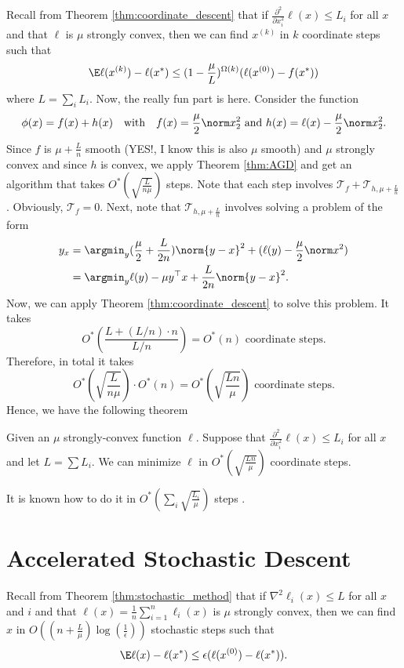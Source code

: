 Recall from Theorem \ref{thm:coordinate_descent} that if $\frac{\partial^{2}}{\partial x_{i}^{2}}\ell(x)\leq L_{i}$
for all $x$ and that $\ell$ is $\mu$ strongly convex, then we can
find $x^{(k)}$ in $k$ coordinate steps such that 
\[
\E\ell(x^{(k)})-\ell(x^{*})\leq(1-\frac{\mu}{L})^{\Omega(k)}(\ell(x^{(0)})-f(x^{*}))
\]
where $L=\sum_{i}L_{i}$. Now, the really fun part is here. Consider
the function 
\[
\phi(x)=f(x)+h(x)\quad\text{with}\quad f(x)=\frac{\mu}{2}\norm x_{2}^{2}\text{ and }h(x)=\ell(x)-\frac{\mu}{2}\norm x_{2}^{2}.
\]
Since $f$ is $\mu+\frac{L}{n}$ smooth (YES!, I know this is also
$\mu$ smooth) and $\mu$ strongly convex and since $h$ is convex,
we apply Theorem \ref{thm:AGD} and get an algorithm that takes $O^{*}(\sqrt{\frac{L}{n\mu}})$
steps. Note that each step involves $\mathcal{T}_{f}+\mathcal{T}_{h,\mu+\frac{L}{n}}$.
Obviously, $\mathcal{T}_{f}=0$. Next, note that $\mathcal{T}_{h,\mu+\frac{L}{n}}$
involves solving a problem of the form
\begin{align*}
y_{x} & =\argmin_{y}(\frac{\mu}{2}+\frac{L}{2n})\norm{y-x}^{2}+(\ell(y)-\frac{\mu}{2}\norm x^{2})\\
 & =\argmin_{y}\ell(y)-\mu y^{\top}x+\frac{L}{2n}\norm{y-x}^{2}.
\end{align*}
Now, we can apply Theorem \ref{thm:coordinate_descent} to solve this
problem. It takes 
\[
O^{*}(\frac{L+(L/n)\cdot n}{L/n})=O^{*}(n)\text{ coordinate steps.}
\]
Therefore, in total it takes
\[
O^{*}(\sqrt{\frac{L}{n\mu}})\cdot O^{*}(n)=O^{*}(\sqrt{\frac{Ln}{\mu}})\text{ coordinate steps}.
\]
Hence, we have the following theorem
\begin{thm}
\label{thm:coordinate_descent_linear_acc}Given an $\mu$ strongly-convex
function $\ell$. Suppose that $\frac{\partial^{2}}{\partial x_{i}^{2}}\ell(x)\leq L_{i}$
for all $x$ and let $L=\sum L_{i}$. We can minimize $\ell$ in \textup{$O^{*}(\sqrt{\frac{Ln}{\mu}})$
coordinate steps.}
\end{thm}

\begin{rem}
It is known how to do it in $O^{*}(\sum_{i}\sqrt{\frac{L_{i}}{\mu}})$
steps \cite{allen2016even}.
\end{rem}


\section{Accelerated Stochastic Descent}

Recall from Theorem \ref{thm:stochastic_method} that if $\nabla^{2}\ell_{i}(x)\leq L$
for all $x$ and $i$ and that $\ell(x)=\frac{1}{n}\sum_{i=1}^{n}\ell_{i}(x)$
is $\mu$ strongly convex, then we can find $x$ in $O((n+\frac{L}{\mu})\log(\frac{1}{\epsilon}))$
stochastic steps such that 
\[
\E\ell(x)-\ell(x^{*})\leq\epsilon(\ell(x^{(0)})-\ell(x^{*})).
\]

